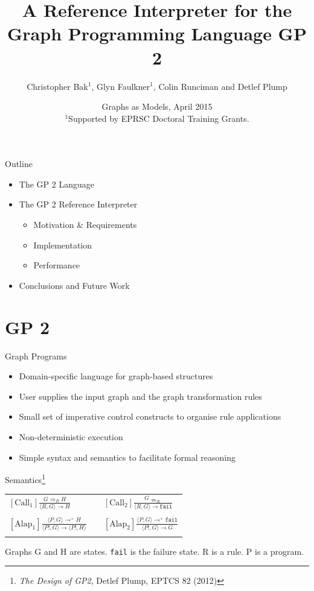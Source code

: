 \documentclass[14pt]{beamer}
\title{\textbf{A Reference Interpreter for the Graph Programming Language GP 2}}
\author{Christopher Bak$^1$, Glyn Faulkner$^1$, Colin Runciman and Detlef Plump}
\institute{Department of Computer Science, The University of York}
\date[GaM 2015]{Graphs as Models, April 2015\\[1em]
{\scriptsize $^1$Supported by EPRSC Doctoral Training Grants.}}
\begin{document}
\begin{frame}
  \titlepage
\end{frame}

\begin{frame}{Outline}
\begin{itemize}\setlength{\itemsep}{10mm}
\item The GP 2 Language
\item The GP 2 Reference Interpreter
  \begin{itemize}
  \item Motivation \& Requirements
  \item Implementation
  \item Performance
  \end{itemize}
\item Conclusions and Future Work
\end{itemize}
\end{frame}

\section{GP 2}

\begin{frame}{Graph Programs}
\begin{itemize}
\item Domain-specific language for graph-based structures
\item User supplies the input graph and the graph transformation rules
\item Small set of imperative control constructs to organise rule applications
\item Non-deterministic execution
\item Simple syntax and semantics to facilitate formal reasoning
\end{itemize}
\end{frame}

\begin{frame}{Semantics\footnote{\textit{The Design of GP2}, Detlef Plump, EPTCS 82 (2012)}}
\begin{center}
\begin{tabular}{lcl}
$\mathrm{[Call_1]} \displaystyle\frac{G \Rightarrow_{R} H}{\langle R,G\rangle \to H}$ 
&&
$\mathrm{[Call_2]} \displaystyle\frac{G \nRightarrow_{R}}{\langle R,G\rangle \to \texttt{fail}}$ 
\\\\
$\mathrm{[Alap_1]} \displaystyle\frac{\langle P, G\rangle \to^+ H}{\langle P!, G\rangle \to \langle P!, H\rangle}$ 
&&
$\mathrm{[Alap_2]} \displaystyle\frac{\langle P, G\rangle \to^+ \texttt{fail}}{\langle P!, G\rangle \to G}$ 
\\\\
\end{tabular} 
\end{center}
\footnotesize{Graphs G and H are states. \texttt{fail} is the failure state. R is a rule. P is a program.}
\end{frame}
\end{document}

